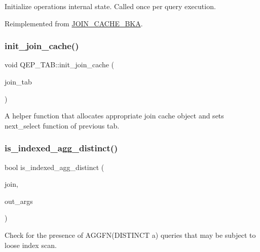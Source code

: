 Initialize operation\textquotesingle{}s internal state. Called once per query execution. 

Reimplemented from \mbox{\hyperlink{group__Query__Optimizer_ga327376f63198bf31a770fb89242d49aa}{J\+O\+I\+N\+\_\+\+C\+A\+C\+H\+E\+\_\+\+B\+KA}}.

\mbox{\label{group__Query__Optimizer_ga44c5164eb9405b18a16ca8a3ee339047}} 
\subsubsection{\texorpdfstring{init\+\_\+join\+\_\+cache()}{init\_join\_cache()}}
{\footnotesize\ttfamily void Q\+E\+P\+\_\+\+T\+A\+B\+::init\+\_\+join\+\_\+cache (\begin{DoxyParamCaption}\item[{\mbox{\hyperlink{classJOIN__TAB}{J\+O\+I\+N\+\_\+\+T\+AB}} $\ast$}]{join\+\_\+tab }\end{DoxyParamCaption})}

A helper function that allocates appropriate join cache object and sets next\+\_\+select function of previous tab. \mbox{\label{group__Query__Optimizer_gaa992e841315769954816105b951d3e17}} 
\subsubsection{\texorpdfstring{is\+\_\+indexed\+\_\+agg\+\_\+distinct()}{is\_indexed\_agg\_distinct()}}
{\footnotesize\ttfamily bool is\+\_\+indexed\+\_\+agg\+\_\+distinct (\begin{DoxyParamCaption}\item[{\mbox{\hyperlink{classJOIN}{J\+O\+IN}} $\ast$}]{join,  }\item[{\mbox{\hyperlink{classList}{List}}$<$ \mbox{\hyperlink{classItem__field}{Item\+\_\+field}} $>$ $\ast$}]{out\+\_\+args }\end{DoxyParamCaption})}

Check for the presence of A\+G\+G\+F\+N(\+D\+I\+S\+T\+I\+N\+C\+T a) queries that may be subject to loose index scan.

